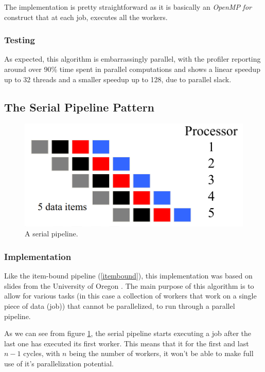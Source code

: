 \documentclass[9pt,journal]{IEEEtran}
\begin{document}
The implementation is pretty straightforward as it is basically an \textit{OpenMP} \textit{for} construct that at each job, executes all the workers.

\subsubsection{Testing}

As expected, this algorithm is embarrassingly parallel, with the profiler reporting around over 90\% time spent in parallel computations and shows a linear speedup up to 32 threads and a smaller speedup up to 128, due to parallel slack.

\subsection{The Serial Pipeline Pattern}

\begin{figure}[htbp]
	\centerline{\includegraphics[scale=0.1]{img/serialpipeline.png}}
	\caption{ A serial pipeline. \cite{pipelineoregon} }
	\label{serialpipe}
\end{figure}

\subsubsection{Implementation}

Like the item-bound pipeline (\ref{itembound}), this implementation was based on slides  from the University of Oregon \cite{pipelineoregon}. The main purpose of this algorithm is to allow for various tasks (in this case a collection of workers that work on a single piece of data (job)) that cannot be parallelized, to run through a parallel pipeline. 

As we can see from figure \ref{serialpipe}, the serial pipeline starts executing a job after the last one has executed its first worker. This means that it for the first and last $ n - 1 $ cycles, with $ n $ being the number of workers, it won't be able to make full use of it's parallelization potential. 
\end{document}
